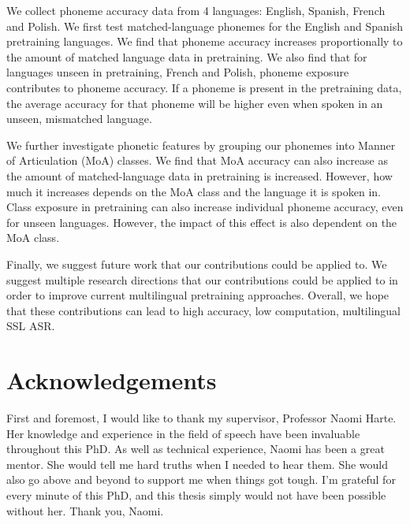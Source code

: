 \documentclass[a4paper,oneside,12pt]{book}
\numberwithin{equation}{chapter} %
\begin{document}
We collect phoneme accuracy data from 4 languages: English, Spanish, French and Polish. We first test matched-language phonemes for the English and Spanish pretraining languages. We find that phoneme accuracy increases proportionally to the amount of matched language data in pretraining. We also find that for languages unseen in pretraining, French and Polish, phoneme exposure contributes to phoneme accuracy. If a phoneme is present in the pretraining data, the average accuracy for that phoneme will be higher even when spoken in an unseen, mismatched language. 

We further investigate phonetic features by grouping our phonemes into Manner of Articulation (MoA) classes. We find that MoA accuracy can also increase as the amount of matched-language data in pretraining is increased. However, how much it increases depends on the MoA class and the language it is spoken in. Class exposure in pretraining can also increase individual phoneme accuracy, even for unseen languages. However, the impact of this effect is also dependent on the MoA class. 

Finally, we suggest future work that our contributions could be applied to. We suggest multiple research directions that our contributions could be applied to in order to improve current multilingual pretraining approaches. Overall, we hope that these contributions can lead to high accuracy, low computation, multilingual SSL ASR.

\newpage
\onehalfspacing\raggedright %



\section*{\Huge{Acknowledgements}}



First and foremost, I would like to thank my supervisor, Professor Naomi Harte. Her knowledge and experience in the field of speech have been invaluable throughout this PhD. As well as technical experience, Naomi has been a great mentor. She would tell me hard truths when I needed to hear them. She would also go above and beyond to support me when things got tough. I'm grateful for every minute of this PhD, and this thesis simply would not have been possible without her. Thank you, Naomi.
\end{document}

